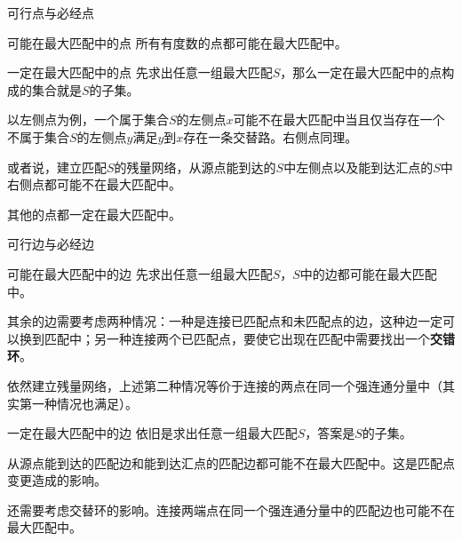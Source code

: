 \documentclass{beamer}
\begin{document}
\begin{frame}{可行点与必经点}
	\begin{block}{可能在最大匹配中的点}
		\pause
		所有有度数的点都可能在最大匹配中。
	\end{block}
	\pause
	\begin{block}{一定在最大匹配中的点}
		\pause
		先求出任意一组最大匹配$S$，那么一定在最大匹配中的点构成的集合就是$S$的子集。
		
		以左侧点为例，一个属于集合$S$的左侧点$x$可能不在最大匹配中当且仅当存在一个不属于集合$S$的左侧点$y$满足$y$到$x$存在一条交替路。右侧点同理。
		
		或者说，建立匹配$S$的残量网络，从源点能到达的$S$中左侧点以及能到达汇点的$S$中右侧点都可能不在最大匹配中。
		
		其他的点都一定在最大匹配中。
	\end{block}
\end{frame}

\begin{frame}{可行边与必经边}
	\begin{block}{可能在最大匹配中的边}
		\pause
		先求出任意一组最大匹配$S$，$S$中的边都可能在最大匹配中。
		
		其余的边需要考虑两种情况：一种是连接已匹配点和未匹配点的边，这种边一定可以换到匹配中；另一种连接两个已匹配点，要使它出现在匹配中需要找出一个\textbf{交错环}。
		
		依然建立残量网络，上述第二种情况等价于连接的两点在同一个强连通分量中（其实第一种情况也满足）。
	\end{block}
	\pause
	\begin{block}{一定在最大匹配中的边}
		\pause
		依旧是求出任意一组最大匹配$S$，答案是$S$的子集。
		
		从源点能到达的匹配边和能到达汇点的匹配边都可能不在最大匹配中。这是匹配点变更造成的影响。
		
		还需要考虑交替环的影响。连接两端点在同一个强连通分量中的匹配边也可能不在最大匹配中。
	\end{block}
\end{frame}
\end{document}
